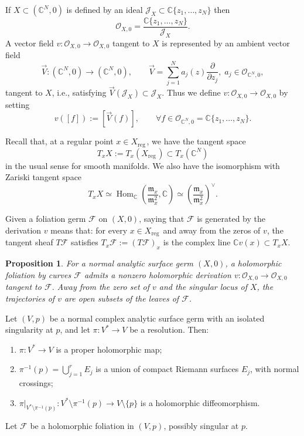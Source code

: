 \documentclass[11pt,twoside]{amsart}
\newcommand{\reg}{\mathrm{reg}\,}
\newcommand{\C}{\mathbb C}
\newcommand{\OO}{\mathcal O}
\newcommand{\F}{\mathcal F}
\newcommand{\J}{\mathcal J}
\DeclareMathOperator{\Hom}{Hom}
\newtheorem{propo}{Proposition}
\theoremstyle{definition}
\begin{document}
If $X\subset(\C^N,0)$ is defined by an ideal $\J_X\subset \C\{z_1,\ldots,z_N\}$ then
\[
\OO_{X,0}=\frac{\C\{z_1,\ldots,z_N\}}{\J_X}.
\]
A vector field $v\colon\OO_{X,0}\to\OO_{X,0}$ tangent to $X$ is represented by an ambient vector field
\[
\vec V\colon(\C^N,0)\to(\C^N,0),
\qquad
\vec V=\sum_{j=1}^{N}a_j(z)\frac{\partial}{\partial z_j},
\;
 a_j\in\OO_{\C^N,0},
\]
tangent to $X$, i.e., satisfying $\vec V(\J_X)\subset\J_X$. Thus we define $v\colon\OO_{X,0}\to\OO_{X,0}$ by setting
\[
v([f]):=[\vec V(f)],\qquad
\forall f\in\OO_{\C^N,0}=\C\{z_1,\ldots,z_N\}.
\]

Recall that, at a regular point $x\in X_{\reg}$, we have the tangent space
\[
T_xX:=T_x(X_{\reg})\subset T_x(\C^N)
\]
in the usual sense for smooth manifolds. We also have the isomorphism with Zariski tangent space
\[
T_xX\simeq \Hom_{\C}\left(\frac{\mathfrak{m}_x}{\mathfrak{m}_x^2},\C\right)
\simeq \left(\frac{\mathfrak{m}_x}{\mathfrak{m}_x^2}\right)^\vee .
\]

Given a foliation germ $\F$ on $(X,0)$, saying that $\F$ is generated by the derivation $v$ means that: for every $x\in X_{\reg}$ and away from the zeros of $v$, the tangent sheaf $T\F$ satisfies $T_x\F:=(T\F)_x$ is the complex line $\C v(x)\subset T_xX$.

\begin{propo}\normalfont
For a normal analytic surface germ $(X,0)$, a holomorphic foliation by curves
$\F$ admits a nonzero holomorphic derivation
$v\colon\OO_{X,0}\to\OO_{X,0}$ tangent to $\F$. Away from the zero set of
$v$ and the singular locus of $X$, the trajectories of $v$ are open subsets
of the leaves of $\F$.
\end{propo}

Let $(V,p)$ be a normal complex analytic surface germ with an isolated
singularity at $p$, and let $\pi\colon V^*\to V$ be a resolution. Then:
\begin{enumerate}
\item[(i)] $\pi\colon V^*\to V$ is a proper holomorphic map;

\item[(ii)] $\pi^{-1}(p)=\displaystyle\bigcup_{j=1}^{r}E_j$
is a union of compact Riemann surfaces $E_j$, with normal crossings;
\item[(iii)] $\pi\big|_{V^*\setminus\pi^{-1}(p)}\colon
V^*\setminus\pi^{-1}(p)\to V\setminus\{p\}$
is a holomorphic diffeomorphism.
\end{enumerate}

Let $\F$ be a holomorphic foliation in $(V,p)$, possibly singular at $p$.
\end{document}
